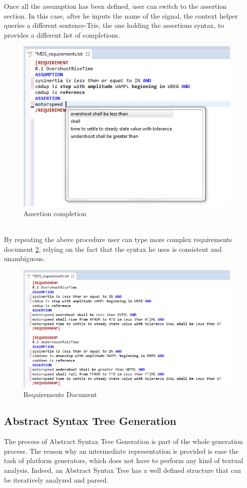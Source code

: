 Once all the assumption has been defined, user can switch to the assertion section. In this case, after he inputs the name of the signal, the context helper queries a different sentence-Trie, the one holding the assertions syntax, to provides a different list of completions.
\begin{figure}[h]
\centering
\includegraphics[width=.65\textwidth]{Figs/assercompl.png}
\caption{Assertion completion}
\label{fig:assercompl}
\end{figure}
\noindent
\\
By repeating the above procedure user can type more complex requirements document \ref{fig:reqdoc}, relying on the fact that the syntax he uses is consistent and unambiguous.
\begin{figure}[h]
\centering
\includegraphics[width=.75\textwidth]{Figs/recdoc.png}
\caption{Requirements Document}
\label{fig:reqdoc}
\end{figure}


\subsection{Abstract Syntax Tree Generation}
\label{sec:ast}

The process of Abstract Syntax Tree Generation is part of the whole generation process. The reason why an intermediate representation is provided is ease the task of platform generators, which does not have to perform any kind of textual analysis. Indeed, an Abstract Syntax Tree has a well defined structure that can be iteratively analyzed and parsed.
